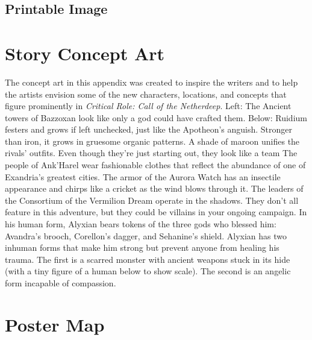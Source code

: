 \documentclass[10pt,a4,twoside,twocolumn,openany,nodeprecatedcode]{dndbook}
\begin{document}
\section{Printable Image}
\chapter{Story Concept Art}
The concept art in this appendix was created to inspire the writers and to help the artists envision some of the new characters, locations, and concepts that figure prominently in \textit{Critical Role: Call of the Netherdeep}.
Left: The Ancient towers of Bazzoxan look like only a god could have crafted them.
Below: Ruidium festers and grows if left unchecked, just like the Apotheon's anguish. Stronger than iron, it grows in gruesome organic patterns.
A shade of maroon unifies the rivals' outfits. Even though they're just starting out, they look like a team
The people of Ank'Harel wear fashionable clothes that reflect the abundance of one of Exandria's greatest cities.
The armor of the Aurora Watch has an insectile appearance and chirps like a cricket as the wind blows through it.
The leaders of the Consortium of the Vermilion Dream operate in the shadows. They don't all feature in this adventure, but they could be villains in your ongoing campaign.
In his human form, Alyxian bears tokens of the three gods who blessed him: Avandra's brooch, Corellon's dagger, and Sehanine's shield.
Alyxian has two inhuman forms that make him strong but prevent anyone from healing his trauma. The first is a scarred monster with ancient weapons stuck in its hide (with a tiny figure of a human below to show scale).
The second is an angelic form incapable of compassion.
\chapter{Poster Map}
\end{document}
